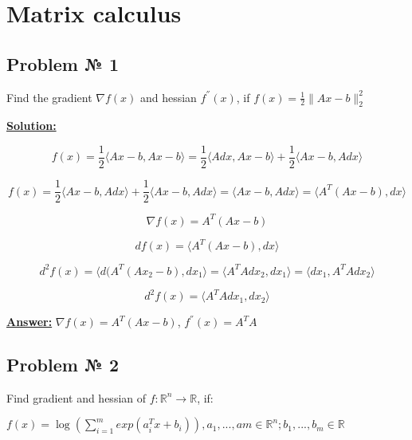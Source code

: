 \section{Matrix calculus}

\subsection{Problem № 1} Find the gradient $\nabla f(x)$ and hessian $f^{''}(x)$, if $f(x) = \frac{1}{2} \|Ax-b \|^2_2$

\underline{\textbf{Solution:}}

\begin{equation*}
    f(x) = \frac{1}{2} \langle Ax-b, Ax-b \rangle = \frac{1}{2} \langle Adx, Ax-b \rangle + \frac{1}{2} \langle Ax-b, Adx \rangle 
\end{equation*}

\begin{equation*}
    f(x) = \frac{1}{2} \langle Ax - b, Adx \rangle +
    \frac{1}{2} \langle Ax - b, Adx \rangle = 
    \langle Ax-b, Adx \rangle = \langle A^T(Ax-b), dx \rangle
\end{equation*}

\begin{equation*}
    \nabla f(x) = A^T(Ax-b)
\end{equation*}

\begin{equation*}
    df(x) = \langle A^T(Ax-b), dx \rangle
\end{equation*}

\begin{equation*}
    d^2f(x) = \langle d(A^T(Ax_2-b), dx_1 \rangle = \langle
    A^TAdx_2, dx_1 \rangle = \langle dx_1, A^TAdx_2 \rangle
\end{equation*}

\begin{equation*}
d^2f(x) = \langle A^TAdx_1, dx_2 \rangle
\end{equation*}

\underline{\textbf{Answer:}} $\nabla f(x) = A^T(Ax-b)$, $f^{''}(x) = A^TA$


\subsection{Problem № 2} Find gradient and hessian of $f: \mathds{R}^n \rightarrow \mathds{R}$, if:

$f(x) = \log \left( \sum\limits_{i=1}^m exp(a^T_ix + b_i) \right), a_1, ..., am \in \mathds{R}^n; b_1, ..., b_m \in \mathds{R}$

